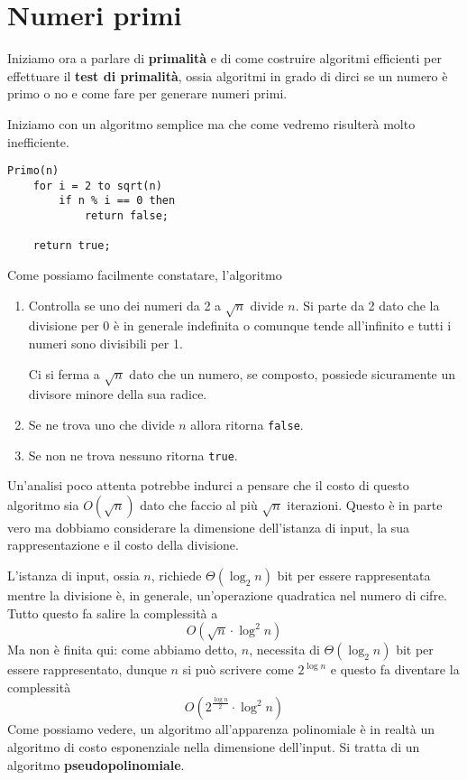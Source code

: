 \chapter{Numeri primi}\label{primi}
Iniziamo ora a parlare di \textbf{primalit\`a} e di come costruire algoritmi efficienti per effettuare il
\textbf{test di primalit\`a}, ossia algoritmi in grado di dirci se un numero \`e primo o no e come fare per generare
numeri primi.

Iniziamo con un algoritmo semplice ma che come vedremo risulter\`a molto inefficiente.
\begin{lstlisting}[style=pseudo-style]
Primo(n)
	for i = 2 to sqrt(n)
		if n % i == 0 then
			return false;
	
	return true;
\end{lstlisting}
Come possiamo facilmente constatare, l'algoritmo
\begin{enumerate}
	\item Controlla se uno dei numeri da 2 a $\sqrt{n}$ divide $n$. Si parte da 2 dato che la divisione per 0 \`e in
	      generale indefinita o comunque tende all'infinito e tutti i numeri sono divisibili per 1.

	      Ci si ferma a $\sqrt{n}$ dato che un numero, se composto, possiede sicuramente un divisore minore della sua
	      radice.
	\item Se ne trova uno che divide $n$ allora ritorna \verb|false|.
	\item Se non ne trova nessuno ritorna \verb|true|.
\end{enumerate}
Un'analisi poco attenta potrebbe indurci a pensare che il costo di questo algoritmo sia $O(\sqrt{n})$ dato che faccio al
pi\`u $\sqrt{n}$ iterazioni. Questo \`e in parte vero ma dobbiamo considerare la dimensione dell'istanza di input, la
sua rappresentazione e il costo della divisione.

L'istanza di input, ossia $n$, richiede $\Theta(\log_2 n)$ bit per essere rappresentata mentre la divisione \`e, in
generale, un'operazione quadratica nel numero di cifre. Tutto questo fa salire la complessit\`a a
\[ O(\sqrt{n} \cdot \log^2 n) \]
Ma non \`e finita qui: come abbiamo detto, $n$, necessita di $\Theta(\log_2 n)$ bit per essere rappresentato, dunque $n$
si pu\`o scrivere come $2^{\log n}$ e questo fa diventare la complessit\`a
\[ O(2^\frac{\log n}{2} \cdot \log^2 n) \]
Come possiamo vedere, un algoritmo all'apparenza polinomiale \`e in realt\`a un algoritmo di costo esponenziale nella
dimensione dell'input. Si tratta di un algoritmo \textbf{pseudopolinomiale}.

